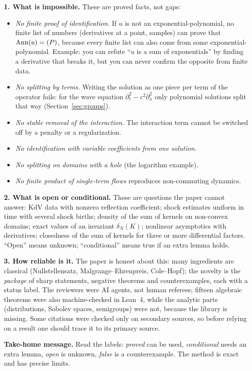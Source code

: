 \medskip\textbf{1. What is impossible.} These are proved facts, not gaps:
\begin{itemize}[nosep]
\item \emph{No finite proof of identification.} If $u$ is not an exponential-polynomial, no finite list of numbers (derivatives at a point, samples) can prove that $\operatorname{Ann}(u)=(P)$, because every finite list can also come from some exponential-polynomial. Example: you can refute ``$u$ is a sum of exponentials'' by finding a derivative that breaks it, but you can never confirm the opposite from finite data.
\item \emph{No splitting by terms.} Writing the solution as one piece per term of the operator fails: for the wave equation $\partial_t^2-c^2\partial_x^2$ only polynomial solutions split that way (Section~\ref{sec:groups}).
\item \emph{No stable removal of the interaction.} The interaction term cannot be switched off by a penalty or a regularization.
\item \emph{No identification with variable coefficients from one solution.}
\item \emph{No splitting on domains with a hole} (the logarithm example).
\item \emph{No finite product of single-term flows} reproduces non-commuting dynamics.
\end{itemize}

\medskip\textbf{2. What is open or conditional.} These are questions the paper cannot answer: KdV data with nonzero reflection coefficient; shock estimates uniform in time with several shock births; density of the sum of kernels on non-convex domains; exact values of an invariant $\delta_N(K)$; nonlinear asymptotics with derivatives; closedness of the sum of kernels for three or more differential factors. ``Open'' means unknown; ``conditional'' means true if an extra lemma holds.

\medskip\textbf{3. How reliable is it.} The paper is honest about this: many ingredients are classical (Nullstellensatz, Malgrange--Ehrenpreis, Cole--Hopf); the novelty is the \emph{package} of sharp statements, negative theorems and counterexamples, each with a status label. The reviewers were AI agents, not human referees; fifteen algebraic theorems were also machine-checked in Lean~4, while the analytic parts (distributions, Sobolev spaces, semigroups) were not, because the library is missing. Some citations were checked only on secondary sources, so before relying on a result one should trace it to its primary source.

\medskip\textbf{Take-home message.} Read the labels: \emph{proved} can be used, \emph{conditional} needs an extra lemma, \emph{open} is unknown, \emph{false} is a counterexample. The method is exact and has precise limits.
